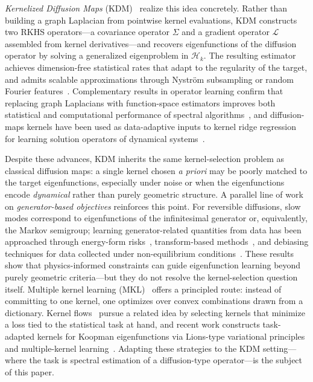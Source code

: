 \documentclass[11pt]{article}
\theoremstyle{remark}
\begin{document}
\emph{Kernelized Diffusion Maps} (KDM)~\citep{pmlr-v195-pillaud-vivien23a} realize this idea concretely.
Rather than building a graph Laplacian from pointwise kernel evaluations, KDM constructs two RKHS operators---a covariance operator $\Sigma$ and a gradient operator $\mathcal{L}$ assembled from kernel derivatives---and recovers eigenfunctions of the diffusion operator by solving a generalized eigenproblem in $\mathcal{H}_k$.
The resulting estimator achieves dimension-free statistical rates that adapt to the regularity of the target, and admits scalable approximations through Nystr\"om subsampling or random Fourier features~\citep{RR08}.
Complementary results in operator learning confirm that replacing graph Laplacians with function-space estimators improves both statistical and computational performance of spectral algorithms~\citep{pmlr-v238-cabannes24a}, and diffusion-maps kernels have been used as data-adaptive inputs to kernel ridge regression for learning solution operators of dynamical systems~\citep{song2025learningsolutionoperatordynamical}.

Despite these advances, KDM inherits the same kernel-selection problem as classical diffusion maps: a single kernel chosen \emph{a priori} may be poorly matched to the target eigenfunctions, especially under noise or when the eigenfunctions encode \emph{dynamical} rather than purely geometric structure.
A parallel line of work on \emph{generator-based objectives} reinforces this point.
For reversible diffusions, slow modes correspond to eigenfunctions of the infinitesimal generator or, equivalently, the Markov semigroup; learning generator-related quantities from data has been approached through energy-form risks~\citep{NEURIPS2024_f930c6e1}, transform-based methods~\citep{kostic2025laplacetransformbasedlowcomplexity}, and debiasing techniques for data collected under non-equilibrium conditions~\citep{NEURIPS2024_89edef87}.
These results show that physics-informed constraints can guide eigenfunction learning beyond purely geometric criteria---but they do not resolve the kernel-selection question itself.
Multiple kernel learning (MKL)~\citep{gonen2011multiple} offers a principled route: instead of committing to one kernel, one optimizes over convex combinations drawn from a dictionary.
Kernel flows~\citep{owhadi2019kernel} pursue a related idea by selecting kernels that minimize a loss tied to the statistical task at hand, and recent work constructs task-adapted kernels for Koopman eigenfunctions via Lions-type variational principles and multiple-kernel learning~\citep{hamzi2025transport,hamzi2025stochastic}.
Adapting these strategies to the KDM setting---where the task is spectral estimation of a diffusion-type operator---is the subject of this paper.
\end{document}
